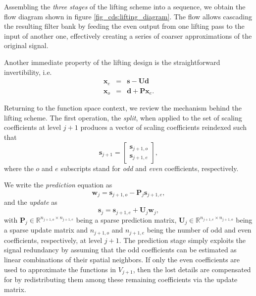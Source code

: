 \documentclass[graybox]{svmult}
\begin{document}
	Assembling the \emph{three stages} of the lifting scheme into a sequence, we obtain the flow diagram shown in figure \ref{fig_cds:lifting_diagram}. The flow allows cascading the resulting filter bank by feeding the even output from one lifting pass to the input of another one, effectively creating a series of coarser approximations of the original signal.
	
	Another immediate property of the lifting design is the straightforward invertibility, i.e.
	\begin{eqnarray}
	\mathbf{x}_e &=& \mathbf{s} - \mathbf{Ud} \\
	\mathbf{x}_o &=& \mathbf{d} + \mathbf{P}\mathbf{x}_e.
	\end{eqnarray}
	
	Returning to the function space context, we review the mechanism behind the lifting scheme. The first operation, the \emph{split}, when applied to the set of scaling coefficients at level $j+1$ produces a vector of scaling coefficients reindexed such that
	\begin{equation}
	\mathbf{s}_{j+1} = \begin{bmatrix} \mathbf{s}_{j+1,o} \\ \mathbf{s}_{j+1,e} \end{bmatrix},
	\label{eq_cds:lifting_splitting}
	\end{equation}
	where the $o$ and $e$ subscripts stand for \emph{odd} and \emph{even} coefficients, respectively. 
	
	We write the \emph{prediction} equation as
	\begin{equation}
	\mathbf{w}_j = \mathbf{s}_{j+1,o} - \mathbf{P}_j \mathbf{s}_{j+1,e},
	\label{eq_cds:coeff_predict}
	\end{equation}
	and the \emph{update} as
	\begin{equation}
	\mathbf{s}_j = \mathbf{s}_{j+1,e} + \mathbf{U}_j \mathbf{w}_j,
	\label{eq_cds:coeff_update}
	\end{equation}
	with $\mathbf{P}_j \in \mathbb{R}^{n_{j+1,o} \times n_{j+1,e}}$ being a sparse prediction matrix, $\mathbf{U}_j \in \mathbb{R}^{n_{j+1,e} \times n_{j+1,o}}$ being a sparse update matrix and $n_{j+1,o}$ and $n_{j+1,e}$ being the number of odd and even coefficients, respectively, at level $j+1$. The prediction stage simply exploits the signal redundancy by assuming that the odd coefficients can be estimated as linear combinations of their spatial neighbors. If only the even coefficients are used to approximate the functions in $V_{j+1}$, then the lost details are compensated for by redistributing them among these remaining coefficients via the update matrix. 
	
\end{document}

